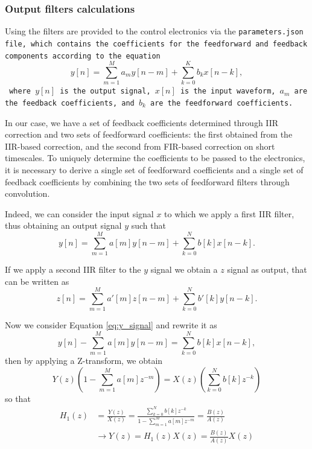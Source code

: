 \subsubsection{Output filters calculations}

Using \Qibolab the filters are provided to the control electronics via the \tt{parameters.json} file, which contains the coefficients for the feedforward and feedback components according to the equation
\begin{equation}\label{eq:OPX_filter}
    y[n] = \sum_{m=1}^{M} a_m y[n - m] + \sum_{k=0}^{K} b_k x[n - k],
\end{equation}
where $y[n]$ is the output signal, $x[n]$ is the input waveform, $a_m$ are the feedback coefficients, and $b_k$ are the feedforward coefficients.

In our case, we have a set of feedback coefficients determined through IIR correction and two sets of feedforward coefficients: the first obtained from the IIR-based correction, and the second from FIR-based correction on short timescales. 
To uniquely determine the coefficients to be passed to the electronics, it is necessary to derive a single set of feedforward coefficients and a single set of feedback coefficients by combining the two sets of feedforward filters through convolution.

Indeed, we can consider the input signal $x$ to which we apply a first IIR filter, thus obtaining an output signal $y$ such that 
\begin{equation}\label{eq:y_signal}
    y[n] = \sum_{m=1}^{M} a[m]y[n-m] + \sum_{k=0}^{N} b[k] x[n-k].
\end{equation}

If we apply a second IIR filter to the $y$ signal we obtain a $z$ signal as output, that can be written as 
\begin{equation}\label{eq:z_signal}
    z[n] = \sum_{m=1}^{M} a'[m]z[n-m] + \sum_{k=0}^{N} b'[k] y[n-k].
\end{equation}

Now we consider Equation \ref{eq:y_signal} and rewrite it as
\begin{equation}\label{eq:y_signal1}
    y[n] - \sum_{m=1}^{M} a[m]y[n-m] = \sum_{k=0}^{N} b[k] x[n-k],
\end{equation} 
then by applying a Z-transform, we obtain
\begin{equation}\label{eq:y_signal_transform}
    Y(z)\left(1 - \sum_{m=1}^{M} a[m] z^{-m} \right) = X(z) \left( \sum_{k=0}^{N} b[k] z^{-k} \right)
\end{equation}
so that 
\begin{align}
    H_1(z) &= \frac{Y(z)}{X(z)} = \frac{\sum_{k=0}^{N} b[k] z^{-k}}{1 - \sum_{m=1}^{M} a[m] z^{-m}} = \frac{B(z)}{A(z)} \\
    & \rightarrow Y(z) = H_1(z)X(z) = \frac{B(z)}{A(z)}X(z) \label{eq:transfer1}
\end{align}

